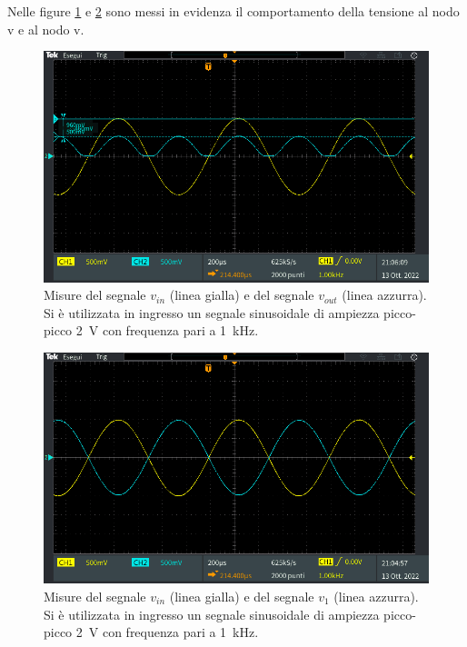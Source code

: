 \noindent
Nelle figure \ref{fig:analisi_circuito_3_1} e \ref{fig:analisi_circuito_3_2} sono messi in evidenza il comportamento della tensione al nodo v e al nodo v.
\begin{figure}[h]
	\centering
	\includegraphics[width=1\linewidth]{./ImageFiles/Laboratorio 2/TEK00043}
	\caption{Misure del segnale $v_{in}$ (linea gialla) e del segnale $v_{out}$ (linea azzurra). Si è utilizzata in ingresso un segnale sinusoidale di ampiezza picco-picco \SI{2}{\volt} con frequenza pari a \SI{1}{\kilo\hertz}.}
	\label{fig:analisi_circuito_3_1}
\end{figure}
\begin{figure}[h]
	\centering
	\includegraphics[width=1\linewidth]{./ImageFiles/Laboratorio 2/TEK00042}
	\caption{Misure del segnale $v_{in}$ (linea gialla) e del segnale $v_{1}$ (linea azzurra). Si è utilizzata in ingresso un segnale sinusoidale di ampiezza picco-picco \SI{2}{\volt} con frequenza pari a \SI{1}{\kilo\hertz}.}
	\label{fig:analisi_circuito_3_2}
\end{figure}


